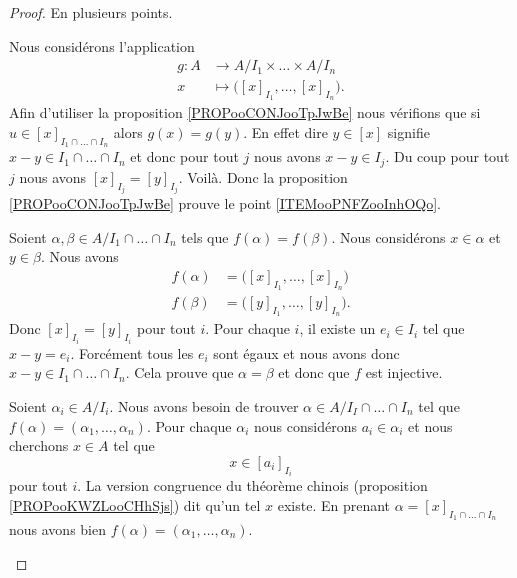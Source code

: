 \begin{proof}
	En plusieurs points.
	\begin{subproof}
		Nous considérons l'application
		\begin{equation}
			\begin{aligned}
				g\colon A & \to A/I_1\times \ldots \times A/I_n             \\
				x         & \mapsto \big( [x]_{I_1},\ldots,[x]_{I_n} \big).
			\end{aligned}
		\end{equation}
		Afin d'utiliser la proposition \ref{PROPooCONJooTpJwBe} nous vérifions que si \( u\in [x]_{I_1\cap\ldots \cap I_n}\) alors \( g(x)=g(y)\). En effet dire \( y\in[x]\) signifie \( x-y\in I_1\cap\ldots\cap I_n\) et donc pour tout \( j\) nous avons \( x-y\in I_j\). Du coup pour tout \( j\) nous avons \( [x]_{I_j}=[y]_{I_j}\). Voilà. Donc la proposition \ref{PROPooCONJooTpJwBe} prouve le point \ref{ITEMooPNFZooInhOQo}.

		\spitem[Injective]
		Soient \( \alpha,\beta\in A/I_1\cap\ldots\cap I_n\) tels que \( f(\alpha)=f(\beta)\). Nous considérons \( x\in \alpha\) et \( y\in \beta\). Nous avons
		\begin{subequations}
			\begin{align}
				f(\alpha) & =\big( [x]_{I_1},\ldots,[x]_{I_n} \big)  \\
				f(\beta)  & =\big( [y]_{I_1},\ldots,[y]_{I_n} \big).
			\end{align}
		\end{subequations}
		Donc \( [x]_{I_i}=[y]_{I_i}\) pour tout \( i\). Pour chaque \( i\), il existe un \( e_i\in I_i\) tel que \( x-y=e_i\). Forcément tous les \( e_i\) sont égaux et nous avons donc \( x-y\in I_1\cap\ldots\cap I_n\). Cela prouve que \( \alpha=\beta\) et donc que \( f\) est injective.

		\spitem[Surjective]
		Soient \( \alpha_i\in A/I_i\). Nous avons besoin de trouver \( \alpha\in A/I_I\cap\ldots\cap I_n\) tel que \( f(\alpha)=(\alpha_1,\ldots,\alpha_n)\). Pour chaque \( \alpha_i\) nous considérons \( a_i\in \alpha_i\) et nous cherchons \( x\in A\) tel que
		\begin{equation}
			x\in[a_i]_{I_i}
		\end{equation}
		pour tout \( i\). La version congruence du théorème chinois (proposition \ref{PROPooKWZLooCHhSjs}) dit qu'un tel \( x\) existe. En prenant \( \alpha=[x]_{I_1\cap\ldots\cap I_n}\) nous avons bien \( f(\alpha)=(\alpha_1,\ldots,\alpha_n)\).


\end{subproof}
\end{proof}
